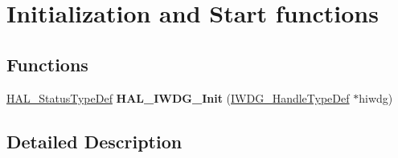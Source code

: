 \hypertarget{group___i_w_d_g___exported___functions___group1}{}\section{Initialization and Start functions}
\label{group___i_w_d_g___exported___functions___group1}
\subsection*{Functions}
\begin{DoxyCompactItemize}
\item 
\mbox{\label{group___i_w_d_g___exported___functions___group1_ga2e1669e60f2dc298fecaed919e7ae810}} 
\hyperlink{stm32f0xx__hal__def_8h_a63c0679d1cb8b8c684fbb0632743478f}{H\+A\+L\+\_\+\+Status\+Type\+Def} {\bfseries H\+A\+L\+\_\+\+I\+W\+D\+G\+\_\+\+Init} (\hyperlink{struct_i_w_d_g___handle_type_def}{I\+W\+D\+G\+\_\+\+Handle\+Type\+Def} $\ast$hiwdg)
\end{DoxyCompactItemize}


\subsection{Detailed Description}
